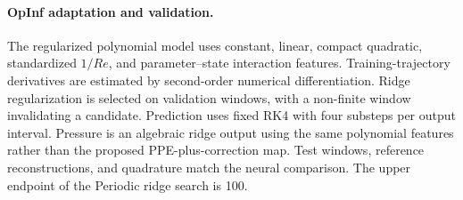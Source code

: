 \paragraph{OpInf adaptation and validation.}
The regularized polynomial model uses constant, linear, compact
quadratic, standardized $1/Re$, and parameter--state interaction
features. Training-trajectory derivatives are estimated by
second-order numerical differentiation.
Ridge regularization is selected on validation windows, with a
non-finite window invalidating a candidate.
Prediction uses fixed RK4 with four substeps per output interval.
Pressure is an algebraic ridge output using the same polynomial
features rather than the proposed PPE-plus-correction map.
Test windows, reference reconstructions, and quadrature match the
neural comparison. The upper endpoint of the Periodic ridge search
is 100.
